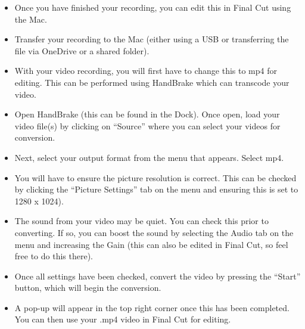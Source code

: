 \documentclass[
]{book}
\begin{document}
\begin{itemize}
\item
  Once you have finished your recording, you can edit this in Final Cut using the Mac.
\item
  Transfer your recording to the Mac (either using a USB or transferring the file via OneDrive or a shared folder).
\item
  With your video recording, you will first have to change this to mp4 for editing. This can be performed using HandBrake which can transcode your video.
\item
  Open HandBrake (this can be found in the Dock). Once open, load your video file(s) by clicking on ``Source'' where you can select your videos for conversion.
\item
  Next, select your output format from the menu that appears. Select mp4.
\item
  You will have to ensure the picture resolution is correct. This can be checked by clicking the ``Picture Settings'' tab on the menu and ensuring this is set to 1280 x 1024).
\item
  The sound from your video may be quiet. You can check this prior to converting. If so, you can boost the sound by selecting the Audio tab on the menu and increasing the Gain (this can also be edited in Final Cut, so feel free to do this there).
\item
  Once all settings have been checked, convert the video by pressing the ``Start'' button, which will begin the conversion.
\item
  A pop-up will appear in the top right corner once this has been completed. You can then use your .mp4 video in Final Cut for editing.
\end{itemize}

  
\end{document}
